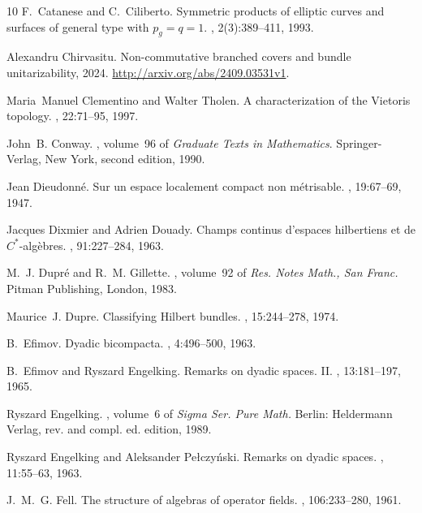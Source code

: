 \documentclass[11pt,leqno]{article}
\theoremstyle{plain}
\theoremstyle{plain}
\theoremstyle{plain}
\numberwithin{equation}{section}
\theoremstyle{nonumberplain}
\newcommand\1{{\bf 1}}
\begin{document}
\begin{thebibliography}{10}
F.~Catanese and C.~Ciliberto.
\newblock Symmetric products of elliptic curves and surfaces of general type
  with {$p_g=q=1$}.
, 2(3):389--411, 1993.

Alexandru Chirvasitu.
\newblock Non-commutative branched covers and bundle unitarizability, 2024.
\newblock \url{http://arxiv.org/abs/2409.03531v1}.

Maria~Manuel Clementino and Walter Tholen.
\newblock A characterization of the {Vietoris} topology.
, 22:71--95, 1997.

John~B. Conway.
, volume~96 of {\em Graduate
  Texts in Mathematics}.
\newblock Springer-Verlag, New York, second edition, 1990.

Jean Dieudonn\'e.
\newblock Sur un espace localement compact non m\'etrisable.
, 19:67--69, 1947.

Jacques Dixmier and Adrien Douady.
\newblock Champs continus d'espaces hilbertiens et de {$C^{\ast} $}-alg\`ebres.
, 91:227--284, 1963.

M.~J. Dupr{\'e} and R.~M. Gillette.
, volume~92 of {\em Res. Notes Math., San Franc.}
\newblock Pitman Publishing, London, 1983.

Maurice~J. Dupre.
\newblock Classifying {Hilbert} bundles.
, 15:244--278, 1974.

B.~Efimov.
\newblock Dyadic bicompacta.
, 4:496--500, 1963.

B.~Efimov and Ryszard Engelking.
\newblock Remarks on dyadic spaces. {II}.
, 13:181--197, 1965.

Ryszard Engelking.
, volume~6 of {\em Sigma Ser. Pure Math.}
\newblock Berlin: Heldermann Verlag, rev. and compl. ed. edition, 1989.

Ryszard Engelking and Aleksander Pe{\l}czy{\'n}ski.
\newblock Remarks on dyadic spaces.
, 11:55--63, 1963.

J.~M.~G. Fell.
\newblock The structure of algebras of operator fields.
, 106:233--280, 1961.


\end{thebibliography}
\end{document}

